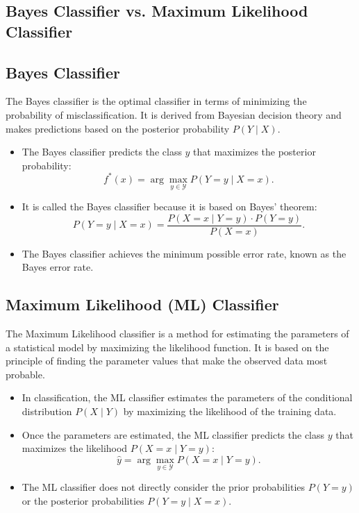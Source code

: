 \begin{notechapter}
\section{Bayes Classifier vs. Maximum Likelihood Classifier}

\subsection{Bayes Classifier}
The Bayes classifier is the optimal classifier in terms of minimizing the probability of misclassification. It is derived from Bayesian decision theory and makes predictions based on the posterior probability \( P(Y \mid X) \).

\begin{itemize}
    \item The Bayes classifier predicts the class \( y \) that maximizes the posterior probability:
      \[
      f^*(x) = \arg\max_{y \in \mathcal{Y}} P(Y = y \mid X = x).
      \]
    \item It is called the Bayes classifier because it is based on Bayes' theorem:
      \[
      P(Y = y \mid X = x) = \frac{P(X = x \mid Y = y) \cdot P(Y = y)}{P(X = x)}.
      \]
    \item The Bayes classifier achieves the minimum possible error rate, known as the Bayes error rate.
\end{itemize}

\subsection{Maximum Likelihood (ML) Classifier}
The Maximum Likelihood classifier is a method for estimating the parameters of a statistical model by maximizing the likelihood function. It is based on the principle of finding the parameter values that make the observed data most probable.

\begin{itemize}
    \item In classification, the ML classifier estimates the parameters of the conditional distribution \( P(X \mid Y) \) by maximizing the likelihood of the training data.
    \item Once the parameters are estimated, the ML classifier predicts the class \( y \) that maximizes the likelihood \( P(X = x \mid Y = y) \):
      \[
      \hat{y} = \arg\max_{y \in \mathcal{Y}} P(X = x \mid Y = y).
      \]
    \item The ML classifier does not directly consider the prior probabilities \( P(Y = y) \) or the posterior probabilities \( P(Y = y \mid X = x) \).
\end{itemize}


\end{notechapter}
